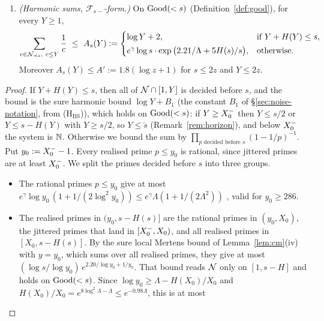 \begin{enumerate}[label=\textup{(F3$'$)},leftmargin=*]
\item\label{eq:sF3p} \emph{(Harmonic sums, $\mathcal F_{s-}$-form.)} On $\mathrm{Good}(<s)$ (Definition~\ref{def:good}), for every $Y\ge1$,
\[
\sum_{c\in\NN_{\prec s},\ c\le Y}\frac1c\ \le\ A_s(Y):=
\begin{cases}
\log Y+2, & \text{if } Y+H(Y)\le s,\\[2pt]
e^{\gamma}\log s\cdot\exp\big(2.21/\Lambda+5H(s)/s\big), & \text{otherwise.}
\end{cases}
\]
Moreover $A_s(Y)\le A':=1.8(\log z+1)$ for $s\le 2z$ and $Y\le 2z$.
\end{enumerate}
\begin{proof}
If $Y+H(Y)\le s$, then all of $\mathcal{N}\cap[1,Y]$ is decided before $s$, and the bound is the sure harmonic bound
$\log Y+B_1$ (the constant $B_1$ of \S\ref{sec:noise-notation}, from \textup{(H$_{\mathrm{BS}}$)}), which holds on $\mathrm{Good}(<s)$: if $Y\ge X_0^{-}$ then $Y\le s/2$ or $Y\le s-H(Y)$ with $Y\ge s/2$, so
$Y\le\check s$ (Remark~\ref{rem:horizon}), and below $X_0^{-}$ the system is $\mathbb{N}$. Otherwise we bound the sum by
$\prod_{p\text{ decided before }s}(1-1/p)^{-1}$.
Put $y_0:=X_0^{-}-1$. Every realised prime $p\le y_0$ is rational, since jittered primes are at least $X_0^{-}$. We split the primes
decided before $s$ into three groups.
\begin{itemize}
\item The rational primes $p\le y_0$ give at most $e^{\gamma}\log y_0\,(1+1/(2\log^2y_0))\le e^{\gamma}\Lambda(1+1/(2\Lambda^2))$
  \cite[Thm.~8, (3.29)]{RosserSchoenfeld1962}, valid for $y_0\ge286$.
\item The realised primes in $(y_0,s-H(s)]$ are the rational primes in $(y_0,X_0)$, the jittered primes that land in
  $[X_0^{-},X_0)$, and all realised primes in $[X_0,s-H(s)]$. By the sure local Mertens bound of Lemma~\ref{lem:cm}(iv) with
  $y=y_0$, which sums over all realised primes, they give at most $(\log s/\log y_0)\,e^{2.20/\log y_0+1/y_0}$. That bound
  reads $\mathcal{N}$ only on $[1,s-H]$ and holds on $\mathrm{Good}(<s)$. Since $\log y_0\ge\Lambda-H(X_0)/X_0$ and
  $H(X_0)/X_0=e^{8\log^2\Lambda-\Lambda}\le e^{-0.98\Lambda}$, this is at most

\end{itemize}
\end{proof}
